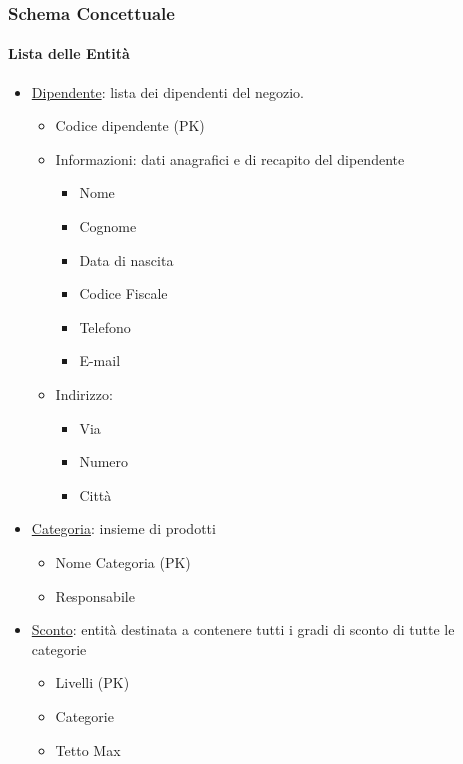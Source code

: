 \subsubsection{Schema Concettuale}

\paragraph*{Lista delle Entit\`a}

\begin{itemize}

\item \underline{Dipendente}: lista dei dipendenti del negozio.
  
  \begin{itemize}

  \item Codice dipendente (PK)
    
  \item Informazioni: dati anagrafici e di recapito del dipendente
    \begin{itemize}
    \item Nome
    \item Cognome
    \item Data di nascita
    \item Codice Fiscale
    \item Telefono
    \item E-mail
    \end{itemize}
    
  \item Indirizzo:
    \begin{itemize}
    \item Via
    \item Numero
    \item Citt\`a
    \end{itemize}

  \end{itemize}

\item \underline{Categoria}: insieme di prodotti
  \begin{itemize}
  \item Nome Categoria (PK)
  \item Responsabile
  \end{itemize}

\item \underline{Sconto}: entit\`a destinata a contenere tutti i gradi di sconto di tutte le categorie
  \begin{itemize}
  \item Livelli (PK)
  \item Categorie
  \item Tetto Max
  \end{itemize}


\end{itemize}
